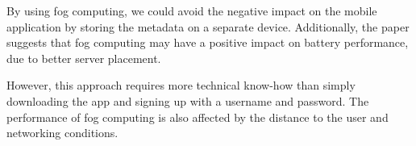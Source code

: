 By using fog computing, we could avoid the negative impact on the mobile application by storing the metadata on a separate device.
Additionally, the paper suggests that fog computing may have a positive impact on battery performance, due to better server placement.

However, this approach requires more technical know-how than simply downloading the app and signing up with a username and password.
The performance of fog computing is also affected by the distance to the user and networking conditions.
